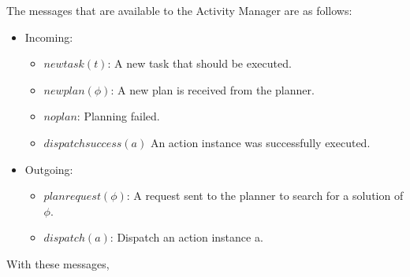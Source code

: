 The messages that are available to the Activity Manager are as follows:
\begin{itemize}
    \item Incoming:
    \begin{itemize}
        \item $newtask(t)$: A new task that should be executed. 
        \item $newplan(\phi)$: A new plan is received from the planner.
        \item $noplan$: Planning failed.
        \item $dispatchsuccess(a)$ An action instance was successfully executed.
    \end{itemize}
    \item Outgoing:
    \begin{itemize}
        \item $planrequest(\phi)$: A request sent to the planner to search for a solution of $\phi$.
        \item $dispatch(a)$: Dispatch an action instance a.
    \end{itemize}
\end{itemize}

With these messages, 

